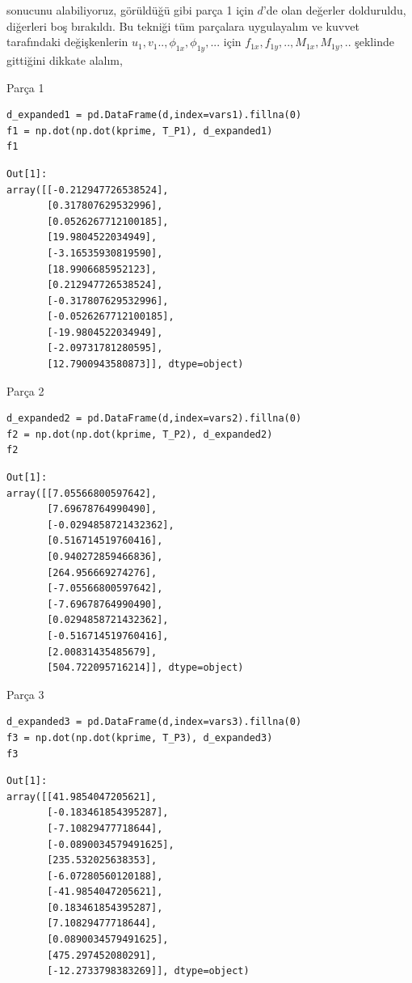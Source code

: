 \documentclass[12pt,fleqn]{article}\usepackage{../../common}
\begin{document}
sonucunu alabiliyoruz, görüldüğü gibi parça 1 için $d$'de olan değerler
dolduruldu, diğerleri boş bırakıldı.  Bu tekniği tüm parçalara uygulayalım ve
kuvvet tarafındaki değişkenlerin $u_1,v_1..,\phi_{1x},\phi_{1y},...$ için
$f_{1x},f_{1y},..,M_{1x},M_{1y},..$ şeklinde gittiğini dikkate alalım,

Parça 1

\begin{verbatim}
d_expanded1 = pd.DataFrame(d,index=vars1).fillna(0)
f1 = np.dot(np.dot(kprime, T_P1), d_expanded1)
f1
\end{verbatim}

\begin{verbatim}
Out[1]: 
array([[-0.212947726538524],
       [0.317807629532996],
       [0.0526267712100185],
       [19.9804522034949],
       [-3.16535930819590],
       [18.9906685952123],
       [0.212947726538524],
       [-0.317807629532996],
       [-0.0526267712100185],
       [-19.9804522034949],
       [-2.09731781280595],
       [12.7900943580873]], dtype=object)
\end{verbatim}

Parça 2

\begin{verbatim}
d_expanded2 = pd.DataFrame(d,index=vars2).fillna(0)
f2 = np.dot(np.dot(kprime, T_P2), d_expanded2)
f2
\end{verbatim}

\begin{verbatim}
Out[1]: 
array([[7.05566800597642],
       [7.69678764990490],
       [-0.0294858721432362],
       [0.516714519760416],
       [0.940272859466836],
       [264.956669274276],
       [-7.05566800597642],
       [-7.69678764990490],
       [0.0294858721432362],
       [-0.516714519760416],
       [2.00831435485679],
       [504.722095716214]], dtype=object)
\end{verbatim}

Parça 3

\begin{verbatim}
d_expanded3 = pd.DataFrame(d,index=vars3).fillna(0)
f3 = np.dot(np.dot(kprime, T_P3), d_expanded3)
f3
\end{verbatim}

\begin{verbatim}
Out[1]: 
array([[41.9854047205621],
       [-0.183461854395287],
       [-7.10829477718644],
       [-0.0890034579491625],
       [235.532025638353],
       [-6.07280560120188],
       [-41.9854047205621],
       [0.183461854395287],
       [7.10829477718644],
       [0.0890034579491625],
       [475.297452080291],
       [-12.2733798383269]], dtype=object)
\end{verbatim}
\end{document}
